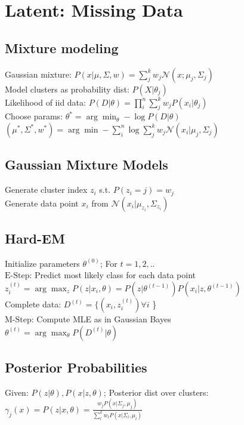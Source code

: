 \section*{\normalsize{Latent: Missing Data}}
\subsection*{Mixture modeling}
Gaussian mixture: $P(x|\mu,\Sigma,w)=\sum_j^k w_j\mathcal{N}(x;\mu_j,\Sigma_j)$\\
Model clusters as probability dist: $P(X|\theta_j) $\\
Likelihood of iid data: $P(D|\theta)=\prod_i^n\sum_j^kw_j P(x_i|\theta_j)$\\
Choose params: $\theta^*=\arg\min_\theta -\log P(D|\theta)$\\
$(\mu^*,\Sigma^*,w^*)=\arg\min - \sum_i^n\log\sum_j^kw_j\mathcal{N}(x_i|\mu_j,\Sigma_j)$

\subsection*{Gaussian Mixture Models}
Generate cluster index $z_i$ s.t. $P(z_i=j)=w_j$\\
Generate data point $x_i$ from $\mathcal{N}(x_i|\mu_{z_i},\Sigma_{z_i})$

\subsection*{Hard-EM}
Initialize parameters $\theta^{(0)}$;  For $t=1,2,..$\\
$\text{E-Step}$: Predict most likely class for each data point\\
$z_i^{(t)}=\arg\max_z P(z|x_i,\theta)=P(z|\theta^{(t-1)})P(x_i|z,\theta^{(t-1)})$\\
Complete data: $D^{(t)}=\{(x_i,z_i^{(t)}) \forall i$ \}\\
$\text{M-Step}$: Compute MLE as in Gaussian Bayes\\
$\theta^{(t)}=\arg\max_\theta P(D^{(t)}|\theta)$
\subsection*{Posterior Probabilities}
Given: $P(z|\theta), P(x|z,\theta)$; Posterior dist over clusters:\\
$\gamma_j(x)=P(z|x,\theta)=\frac{w_jP(x|\Sigma_j,\mu_j)}{\sum_l^k w_l P(x|\Sigma_l,\mu_l)}$
